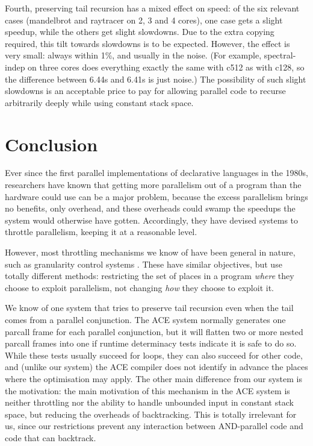 Fourth, preserving tail recursion has a mixed effect on speed:
of the six relevant cases (mandelbrot and raytracer on 2, 3 and 4 cores),
one case gets a slight speedup, while the others get slight slowdowns.
Due to the extra copying required,
this tilt towards slowdowns is to be expected.
However, the effect is very small:
always within 1\%, and usually in the noise.
(For example, spectral-indep on three cores
does everything exactly the same with c512 as with c128,
so the difference between 6.44s and 6.41s is just noise.)
The possibility of such slight slowdowns is an acceptable price to pay
for allowing parallel code to recurse arbitrarily deeply
while using constant stack space.

\section{Conclusion}
\label{sec:lc_conc}


Ever since the first parallel implementations
of declarative languages in the 1980s,
researchers have known that getting more parallelism out of a program
than the hardware could use can be a major problem,
because the excess parallelism brings no benefits, only overhead,
and these overheads could swamp
the speedups the system would otherwise have gotten.
Accordingly, they have devised systems to throttle parallelism,
keeping it at a reasonable level.

However, most throttling mechanisms we know of
have been general in nature,
such as granularity control systems \citep{lopez96:distance_granularity}.
These have similar objectives,
but use totally different methods:
restricting the set of places in a program
\emph{where} they choose to exploit parallelism,
not changing \emph{how} they choose to exploit it.

We know of one system that tries to preserve tail recursion
even when the tail comes from a parallel conjunction.
The ACE system \citep{gupta01:optimization_for_parallel_nodet_code}
normally generates one parcall frame for each parallel conjunction,
but it will flatten two or more nested parcall frames into one
if runtime determinacy tests indicate it is safe to do so.
While these tests usually succeed for loops,
they can also succeed for other code,
and (unlike our system) the ACE compiler does not identify in advance
the places where the optimisation may apply.
The other main difference from our system is the motivation:
the main motivation of this mechanism in the ACE system is
neither throttling
nor the ability to handle unbounded input in constant stack space,
but reducing the overheads of backtracking.
This is totally irrelevant for us,
since our restrictions prevent any interaction
between AND-parallel code and code that can backtrack.

